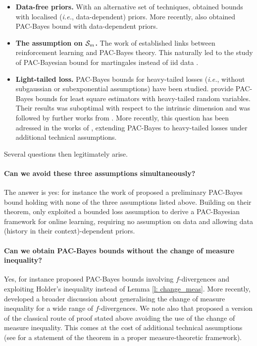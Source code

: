   \begin{itemize}
    \item \textbf{Data-free priors.} With an alternative set of techniques, \citet{catoni2007pac} obtained bounds with localised (\emph{i.e.}, data-dependent) priors. More recently, \citet{lever2010distribution,parradohernandez2012pac,lever2013tighter,oneto2016pac,dziugaite2017computing,mhammedi2019pac} also obtained PAC-Bayes bound with data-dependent priors.
    \item \textbf{The \iid assumption on $\mathcal{S}_m$.} The work of \citet{fard2010pac} established links between reinforcement learning and PAC-Bayes theory. This naturally led to the study of PAC-Bayesian bound for martingales instead of iid data \citep{seldin2011pac,seldin2012bandit,seldin2012pac}.
    \item \textbf{Light-tailed loss.} PAC-Bayes bounds for heavy-tailed losses (\emph{i.e.}, without subgaussian or subexponential assumptions) have been studied. \citet{audibert2011robust} provide PAC-Bayes bounds for least square estimators with heavy-tailed random variables. Their results was suboptimal with respect to the intrinsic dimension and was followed by further works from  \citet{catoni2016pac,catoni2016pac}.
    More recently, this question has been adressed in the works of \citet{alquier2018simpler, holland2019pac,kuzborskij2019efron,haddouche2021pac}, extending PAC-Bayes to heavy-tailed losses under additional technical assumptions.
  \end{itemize}





Several questions then legitimately arise.
\paragraph{Can we avoid these three assumptions simultaneously?}
The answer is yes: for instance the work of \citet{rivasplata2020pac} proposed a preliminary PAC-Bayes bound holding with none of the three assumptions listed above. Building on their theorem, \citet{haddouche2022online} only exploited a bounded loss assumption to derive a PAC-Bayesian framework for online learning, requiring no assumption on data and allowing data (history in their context)-dependent priors.

\paragraph{Can we obtain PAC-Bayes bounds without the change of measure inequality?} Yes, for instance \citet{alquier2018simpler} proposed PAC-Bayes bounds involving $f$-divergences and exploiting Holder's inequality instead of Lemma \ref{l: change_meas}. More recently, \citet{ohnishi2021novel,picard2022change} developed a broader discussion about generalising the change of measure inequality for a wide range of $f$-divergences. We note also that \citet{germain2009pac} proposed a version of the classical route of proof stated above avoiding the use of the change of measure inequality.
This comes at the cost of additional technical assumptions (see \citealp[][Theorem 1]{haddouche2021pac} for a statement of the theorem in a proper measure-theoretic framework).

